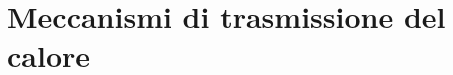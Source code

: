 \documentclass[letterpaper,10pt,english]{jupyterBook}
\begin{document}
\chapter{Meccanismi di trasmissione del calore}
\label{\detokenize{ch/heat_transmission:meccanismi-di-trasmissione-del-calore}}\label{\detokenize{ch/heat_transmission:classical-thermodynamics-heat-transmission}}\label{\detokenize{ch/heat_transmission::doc}}






\renewcommand{\indexname}{Index}
\printindex
\end{document}
